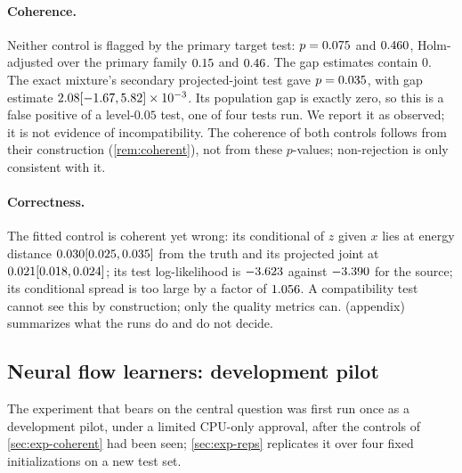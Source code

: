 \documentclass{article}
\theoremstyle{plain}
\theoremstyle{definition}
\theoremstyle{remark}
\begin{document}
\begin{table}[t]
\centering
\caption{Coherent-joint controls on the mixture probe (Test~P, $N=200$, $M=64$, $B=199$). $\widehat\Delta_T$ is the mean unbiased energy distance between the two branches. $D(\text{model},\text{truth})$ is the closed-form energy distance between the model's and the true conditional of $z$ given $x$, averaged over test examples. Both are standardized.}
\label{tab:synlearn}
\scriptsize
\setlength{\tabcolsep}{2pt}

\end{table}

\paragraph{Coherence.}
Neither control is flagged by the primary target test: $p=0.075$ and $0.460$, Holm-adjusted over the primary family $0.15$ and $0.46$. The gap estimates contain $0$.
The exact mixture's secondary projected-joint test gave $p=0.035$, with gap estimate $2.08 [-1.67, 5.82]\times10^{-3}$.
Its population gap is exactly zero, so this is a false positive of a level-$0.05$ test, one of four tests run. We report it as observed; it is not evidence of incompatibility.
The coherence of both controls follows from their construction (\cref{rem:coherent}), not from these $p$-values; non-rejection is only consistent with it.

\paragraph{Correctness.}
The fitted control is coherent yet wrong: its conditional of $z$ given $x$ lies at energy distance $0.030 [0.025, 0.035]$ from the truth and its projected joint at $0.021 [0.018, 0.024]$; its test log-likelihood is $-3.623$ against $-3.390$ for the source; its conditional spread is too large by a factor of $1.056$.
A compatibility test cannot see this by construction; only the quality metrics can.
 (appendix) summarizes what the runs do and do not decide.



\subsection{Neural flow learners: development pilot}
\label{sec:exp-real}
The experiment that bears on the central question was first run once as a development pilot, under a limited CPU-only approval, after the controls of \cref{sec:exp-coherent} had been seen; \cref{sec:exp-reps} replicates it over four fixed initializations on a new test set.
\end{document}
